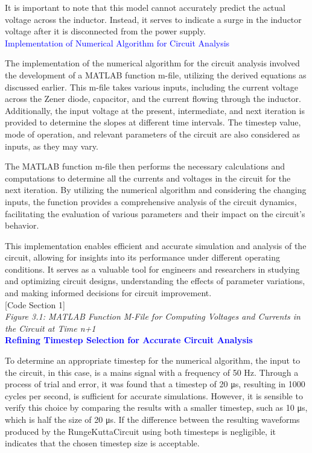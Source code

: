 It is important to note that this model cannot accurately predict the actual voltage across the inductor. Instead, it serves to indicate a surge in the inductor voltage after it is disconnected from the power supply.\\

\Large\textcolor{blue}{Implementation of Numerical Algorithm for Circuit Analysis}

The implementation of the numerical algorithm for the circuit analysis involved the development of a MATLAB function m-file, utilizing the derived equations as discussed earlier. This m-file takes various inputs, including the current voltage across the Zener diode, capacitor, and the current flowing through the inductor. Additionally, the input voltage at the present, intermediate, and next iteration is provided to determine the slopes at different time intervals. The timestep value, mode of operation, and relevant parameters of the circuit are also considered as inputs, as they may vary.

The MATLAB function m-file then performs the necessary calculations and computations to determine all the currents and voltages in the circuit for the next iteration. By utilizing the numerical algorithm and considering the changing inputs, the function provides a comprehensive analysis of the circuit dynamics, facilitating the evaluation of various parameters and their impact on the circuit's behavior.

This implementation enables efficient and accurate simulation and analysis of the circuit, allowing for insights into its performance under different operating conditions. It serves as a valuable tool for engineers and researchers in studying and optimizing circuit designs, understanding the effects of parameter variations, and making informed decisions for circuit improvement.\\

[Code Section 1]\\

\emph{Figure 3.1: MATLAB Function M-File for Computing Voltages and Currents in the Circuit at Time n+1}\\

\Large\textcolor{blue}{\textbf{Refining Timestep Selection for Accurate Circuit Analysis}}


To determine an appropriate timestep for the numerical algorithm, the input to the circuit, in this case, is a mains signal with a frequency of 50 Hz. Through a process of trial and error, it was found that a timestep of 20 μs, resulting in 1000 cycles per second, is sufficient for accurate simulations. However, it is sensible to verify this choice by comparing the results with a smaller timestep, such as 10 μs, which is half the size of 20 μs. If the difference between the resulting waveforms produced by the RungeKuttaCircuit using both timesteps is negligible, it indicates that the chosen timestep size is acceptable.

